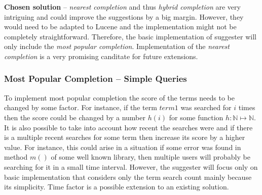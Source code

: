 \textbf{Chosen solution} – \textit{nearest completion} and thus \textit{hybrid completion} are very intriguing and could
improve the suggestions by a big margin. However, they would need to be adapted to Lucene and the implementation
might not be completely straightforward. Therefore, the basic implementation of suggester will only include the
\textit{most popular completion}. Implementation of the \textit{nearest completion} is a very promising canditate for
future extensions.

\subsubsection{Most Popular Completion – Simple Queries}

To implement most popular completion the score of the terms needs to be changed by some factor. For instance, if the term
$term1$ was searched for $i$ times then the score could be changed by a number $h(i)$ for some function $h: \mathbb{N} \mapsto \mathbb{N}$.
It is also possible to take into account how recent the searches were and if there is a multiple recent searches for some
term then increase its score by a higher value. For instance, this could arise in a situation if some error was found in
method $m()$ of some well known library, then multiple users will probably be searching for it in a small time interval.
However, the suggester will focus only on basic implementation that considers only the term search count mainly because
its simplicity. Time factor is a possible extension to an existing solution.

